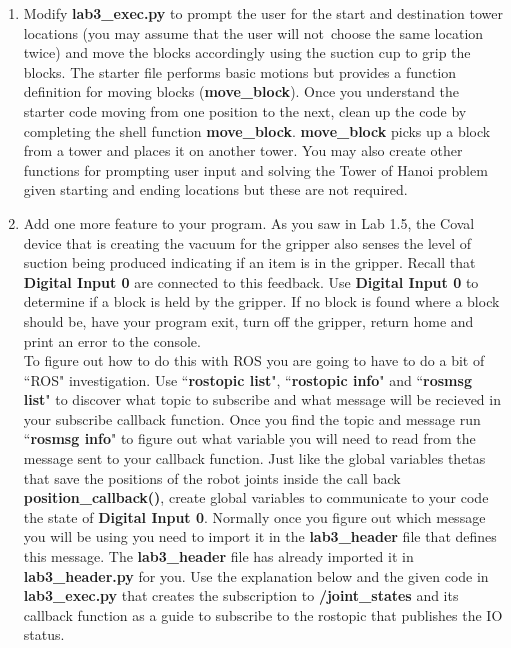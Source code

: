 \begin{enumerate}
\item Modify \textbf{lab3\_exec.py} to prompt the user for the start and destination tower locations (you may assume that the user will not\
choose the same location twice) and move the blocks accordingly using the suction cup to grip the blocks.  The starter file performs basic motions 
but provides a function definition for moving blocks (\textbf{move\_block}). Once you understand
the starter code moving from one position to the next, clean up the code by completing the shell function \textbf{move\_block}.  
\textbf{move\_block} picks up a block from a tower and places it on another tower. You may also create other functions for prompting user input and solving the Tower of Hanoi problem given starting and ending locations but these are not required.  
\item Add one more feature to your program.  As you saw in Lab 1.5, the Coval device that is creating the vacuum for the gripper also senses
the level of suction being produced indicating if an item is in the gripper.  Recall that \textbf{Digital Input 0} are connected to
this feedback.  Use \textbf{Digital Input 0} to determine if a block is held by the gripper.  If no block is found where a block should be,
have your program exit, turn off the gripper, return home and print an error to the console.\\
To figure out how to do this with ROS you are going to have to do a bit of ``ROS" investigation.  Use ``\textbf{rostopic list}", ``\textbf{rostopic info}" and ``\textbf{rosmsg list}" to discover
what topic to subscribe and what message will be recieved in your subscribe callback function.  Once you find the topic and message run ``\textbf{rosmsg info}"
to figure out what variable you will need to read from the message sent to your callback function.  Just like the global variables thetas that
save the positions of the robot joints inside the call back \textbf{position\_callback()}, create global variables
to communicate to your code the state of \textbf{Digital Input 0}.  Normally once you figure out which message you will be using 
you need to import it in the \textbf{lab3\_header} file that defines this message.  The \textbf{lab3\_header} file has already imported it in \textbf{lab3\_header.py} for you.  Use the explanation below
and the given code in \textbf{lab3\_exec.py} that creates the subscription to \textbf{/joint\_states} and its callback function as a guide to subscribe to the rostopic
that publishes the IO status.     

\end{enumerate}


